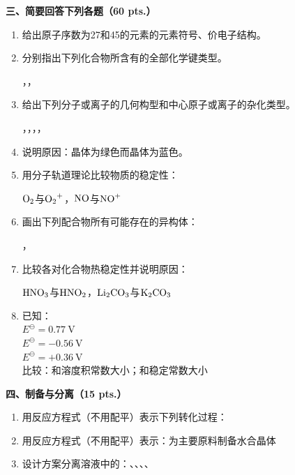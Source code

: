 \vspace{0.5cm}
\noindent\textbf{三、简要回答下列各题（60 pts.）}

\begin{enumerate}[label=\arabic*., start=1, itemsep=1.5ex]
    \item 给出原子序数为27和45的元素的元素符号、价电子结构。
    \item 分别指出下列化合物所含有的全部化学键类型。
    
    {\centering
    ，， \par
    }
    \item 给出下列分子或离子的几何构型和中心原子或离子的杂化类型。
    
    {\centering
    ，，，， \par
    }
    \item 说明原因：晶体为绿色而晶体为蓝色。
    \item 用分子轨道理论比较物质的稳定性：
    
    {\centering
    $\ce{O2}$与$\ce{O2^{+}}$，$\ce{NO}$与$\ce{NO^{+}}$ \par
    }
    \item 画出下列配合物所有可能存在的异构体：
    
    {\centering
    ， \par
    }
    \item 比较各对化合物热稳定性并说明原因：
    
    {\centering
    $\ce{HNO3}$与$\ce{HNO2}$，$\ce{Li2CO3}$与$\ce{K2CO3}$ \par
    }
    \item 已知：\\
     \quad $E^\ominus = 0.77\ \text{V}$ \\
     \quad $E^\ominus = -0.56\ \text{V}$ \\
     \quad $E^\ominus = +0.36\ \text{V}$
    \\
    比较：和溶度积常数大小；和稳定常数大小
\end{enumerate}

\vspace{0.5cm}
\noindent\textbf{四、制备与分离（15 pts.）}

\begin{enumerate}[label=\arabic*., start=1, itemsep=1.5ex]
    \item 用反应方程式（不用配平）表示下列转化过程：
    
    \item 用反应方程式（不用配平）表示：为主要原料制备水合晶体
    \item 设计方案分离溶液中的：、、、、
\end{enumerate}

